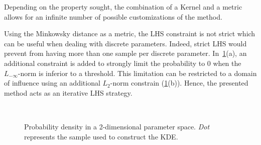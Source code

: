 Depending on the property sought, the combination of a Kernel and a metric allows for an infinite number of possible customizations of the method.

Using the Minkowsky distance as a metric, the LHS constraint is not strict which can be useful when dealing with discrete parameters. Indeed, strict LHS would prevent from having more than one sample per discrete parameter. In~\cref{fig:lhs_const}(a), an additional constraint is added to strongly limit the probability to 0 when the $L_{-\infty}$-norm is inferior to a threshold. This limitation can be restricted to a domain of influence using an additional $L_2$-norm constrain (\cref{fig:lhs_const}(b)). Hence, the presented method acts as an iterative LHS strategy.



\begin{figure}[!ht]               
\centering
{}
~

\caption{Probability density in a 2-dimensional parameter space. \emph{Dot} represents the sample used to construct the KDE.}
 \label{fig:lhs_const}
\end{figure}



